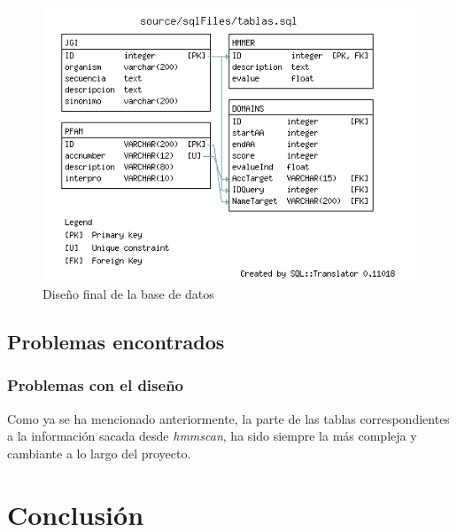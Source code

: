 \documentclass[11pt]{article} %
\begin{document}
\begin{figure}
\centering
\includegraphics[width=15cm]{design}
\caption{Dise\~no final de la base de datos\label{fig:Design}}
\end{figure}

\subsection{Problemas encontrados}

\subsubsection{Problemas con el dise\~no}

Como ya se ha mencionado anteriormente, la parte de las tablas correspondientes a la informaci\'on sacada desde \emph{hmmscan}, ha sido siempre la m\'as compleja y cambiante a lo largo del proyecto.

\section{Conclusi\'on}
\end{document}
